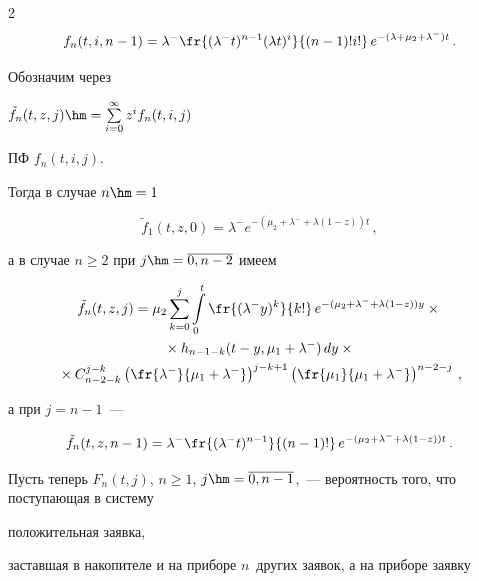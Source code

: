 \begin{multicols}{2}
$$


f_n(t,i,n-1) = \lambda^- \fr{(\lambda^- t)^{n-1} (\lambda t)^i }{(n-1)! i! }\, e^{-(\lambda+\mu_2+\lambda^-) t}\,.


$$








Обозначим через


$\tilde f_n(t,z,j)\hm=\sum\limits_{i=0}^\infty z^i f_n(t,i,j)$


ПФ $f_n(t,i,j)$.


Тогда в случае $n\hm=1$


$$


\tilde f_1(t,z,0) = \lambda^-  e^{-(\mu_2 + \lambda^- +\lambda (1-z)) t}\,,


$$


а в случае $n \ge 2$ при $j\hm=\overline{0,n-2}$ имеем


\begin{multline*}


\tilde f_n(t,z,j) = \mu_2 \sum\limits_{k=0}^{j}


\int\limits_{0}^{t} \fr{(\lambda^- y)^k}{k! }\, e^{-(\mu_2+\lambda^- + \lambda (1-z)) y}\times{}\\


{}\times


h_{n-1-k}(t-y,\mu_1+\lambda^-)\,dy


\times{}


\\


{}\times


C_{n-2-k}^{j-k} \left(\fr{\lambda^- }{\mu_1 + \lambda^-}\right)^{j-k+1}


          \left(\fr{\mu_1 }{\mu_1 + \lambda^-}\right)^{n-2-j}\,,


\end{multline*}


а при $j=n-1$~---


$$


\tilde f_n(t,z,n-1) = \lambda^- \fr{(\lambda^- t)^{n-1}}{(n-1)!}\, e^{-(\mu_2+\lambda^- + \lambda (1-z)) t}\,.


$$





Пусть теперь $F_n(t,j)$, $n\ge 1$, $j\hm=\overline{0,n-1}$,~--- вероятность того, что поступающая в систему 


положительная заявка,


заставшая в накопителе и на приборе $n$~других заявок, а на приборе заявку



\end{multicols}
